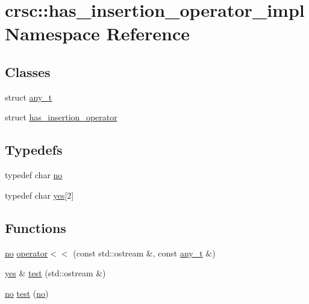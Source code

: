 \hypertarget{namespacecrsc_1_1has__insertion__operator__impl}{}\section{crsc\+:\+:has\+\_\+insertion\+\_\+operator\+\_\+impl Namespace Reference}
\label{namespacecrsc_1_1has__insertion__operator__impl}
\subsection*{Classes}
\begin{DoxyCompactItemize}
\item 
struct \hyperlink{structcrsc_1_1has__insertion__operator__impl_1_1any__t}{any\+\_\+t}
\item 
struct \hyperlink{structcrsc_1_1has__insertion__operator__impl_1_1has__insertion__operator}{has\+\_\+insertion\+\_\+operator}
\end{DoxyCompactItemize}
\subsection*{Typedefs}
\begin{DoxyCompactItemize}
\item 
typedef char \hyperlink{namespacecrsc_1_1has__insertion__operator__impl_a1a44a6ed202363d567b53a9abe8191a7}{no}
\item 
typedef char \hyperlink{namespacecrsc_1_1has__insertion__operator__impl_ab0dc7f56fe45b46b87bb577b7171858c}{yes}\mbox{[}2\mbox{]}
\end{DoxyCompactItemize}
\subsection*{Functions}
\begin{DoxyCompactItemize}
\item 
\hyperlink{namespacecrsc_1_1has__insertion__operator__impl_a1a44a6ed202363d567b53a9abe8191a7}{no} \hyperlink{namespacecrsc_1_1has__insertion__operator__impl_ad60743be3d3fcbb75c6bc5cdf33250f7}{operator$<$$<$} (const std\+::ostream \&, const \hyperlink{structcrsc_1_1has__insertion__operator__impl_1_1any__t}{any\+\_\+t} \&)
\item 
\hyperlink{namespacecrsc_1_1has__insertion__operator__impl_ab0dc7f56fe45b46b87bb577b7171858c}{yes} \& \hyperlink{namespacecrsc_1_1has__insertion__operator__impl_aa24ee37999d6977adf54ba500c212841}{test} (std\+::ostream \&)
\item 
\hyperlink{namespacecrsc_1_1has__insertion__operator__impl_a1a44a6ed202363d567b53a9abe8191a7}{no} \hyperlink{namespacecrsc_1_1has__insertion__operator__impl_a4e6afce3e5439649e93a82e50b125eac}{test} (\hyperlink{namespacecrsc_1_1has__insertion__operator__impl_a1a44a6ed202363d567b53a9abe8191a7}{no})
\end{DoxyCompactItemize}


